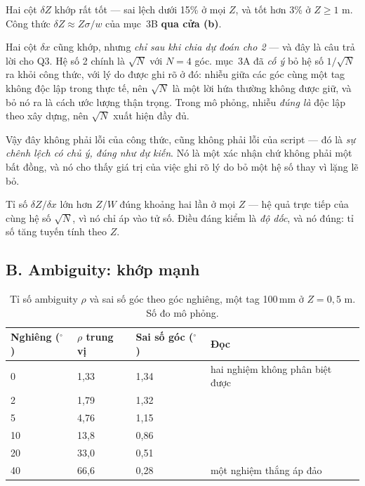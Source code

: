 \documentclass[../../marker.tex]{subfiles}
\begin{document}
Hai cột \(\delta Z\) khớp rất tốt --- sai lệch dưới 15\% ở mọi \(Z\), và tốt hơn 3\% ở \(Z \ge 1\) m. Công thức \(\delta Z \approx Z\sigma/w\) của  mục~3B \textbf{qua cửa (b)}.

Hai cột \(\delta x\) cũng khớp, nhưng \emph{chỉ sau khi chia dự đoán cho 2} --- và đây là câu trả lời cho Q3. Hệ số 2 chính là \(\sqrt{N}\) với \(N = 4\) góc.  mục~3A đã \emph{cố ý} bỏ hệ số \(1/\sqrt{N}\) ra khỏi công thức, với lý do được ghi rõ ở đó: nhiễu giữa các góc cùng một tag không độc lập trong thực tế, nên \(\sqrt{N}\) là một lời hứa thường không được giữ, và bỏ nó ra là cách ước lượng thận trọng. Trong mô phỏng, nhiễu \emph{đúng là} độc lập theo xây dựng, nên \(\sqrt{N}\) xuất hiện đầy đủ.

Vậy đây không phải lỗi của công thức, cũng không phải lỗi của script --- đó là \emph{sự chênh lệch có chủ ý, đúng như dự kiến}. Nó là một xác nhận chứ không phải một bất đồng, và nó cho thấy giá trị của việc ghi rõ lý do bỏ một hệ số thay vì lặng lẽ bỏ.

Tỉ số \(\delta Z/\delta x\) lớn hơn \(Z/W\) đúng khoảng hai lần ở mọi \(Z\) --- hệ quả trực tiếp của cùng hệ số \(\sqrt{N}\), vì nó chỉ áp vào tử số. Điều đáng kiểm là \emph{độ dốc}, và nó đúng: tỉ số tăng tuyến tính theo \(Z\).

\subsection{B. Ambiguity: khớp mạnh}

\begin{table}[H]\centering\small
\caption{Tỉ số ambiguity \(\rho\) và sai số góc theo góc nghiêng, một tag 100\,mm ở \(Z = 0{,}5\) m. Số đo mô phỏng.}
\label{tab:c16-rho}
\begin{tabularx}{\linewidth}{@{}L{2.6cm}L{2.2cm}L{2.6cm}Y@{}}
\toprule
Nghiêng (\(^\circ\)) & \(\rho\) trung vị & Sai số góc (\(^\circ\)) & Đọc\\
 & 1,33 & 1,34 & hai nghiệm không phân biệt được\\
2 & 1,79 & 1,32 & \\
5 & 4,76 & 1,15 & \\
10 & 13,8 & 0,86 & \\
20 & 33,0 & 0,51 & \\
40 & 66,6 & 0,28 & một nghiệm thắng áp đảo\\
\bottomrule
\end{tabularx}
\end{table}
\end{document}

